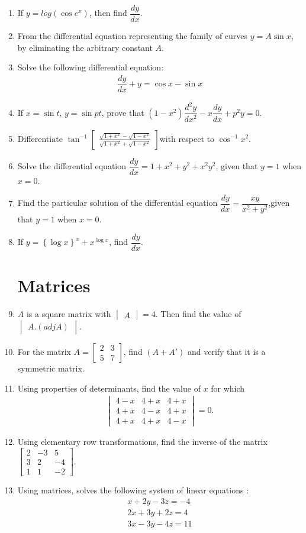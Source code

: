 \documentclass[12pt,-letter paper]{article}
\providecommand{\mydet}[1]{\ensuremath{\begin{vmatrix}#1\end{vmatrix}}}
\providecommand{\myvec}[1]{\ensuremath{\begin{bmatrix}#1\end{bmatrix}}}
\providecommand{\cbrak}[1]{\ensuremath{\left\{#1\right\}}}
\providecommand{\brak}[1]{\ensuremath{\left(#1\right)}}
\begin{document}
{\begin{enumerate}
\section{\centering Differentiation}
\item If ${y}=log{\brak{\cos e^x}}$, then find $\dfrac{dy}{dx}$.
\item From the differential equation representing the family of curves ${y} = A\sin x$, by eliminating the arbitrary constant ${A}$.
\item Solve the following differential equation: \begin{align*} \dfrac{dy}{dx}+{y}=\cos {x}-\sin {x} \end{align*}
\item If ${x}=\sin {t}$, ${y}=\sin {pt}$, prove that $(1-x^2)\dfrac{d^2 y}{d x^2}-x\dfrac{dy}{dx}+{p}^{2}{y}=0$.
\item Differentiate $\tan^{-1}\myvec{\frac{\sqrt{1+x^2}-\sqrt{1-x^2}}{\sqrt{1+x^2}+\sqrt{1-x^2}}} $with respect to $\cos^{-1} {x}^{2}$.
\item Solve the differential equation $\dfrac{dy}{dx} = 1+{x}^{2}+ {y}^{2}+{x}^{2}{y}^{2}$, given that ${y}=1$ when ${x}=0$.
\item Find the particular solution of the differential equation $\dfrac{dy}{dx}=\dfrac{xy}{x^{2}+y^{2}}$,given that ${y}=1$ when ${x}=0$.
\item If ${y}=\cbrak{\log{x}}^{x} + {x}^{\log{x}}$, find $\dfrac{dy}{dx}$.
\section{ \centering Matrices}
\item ${A}$ is a square matrix with $\mydet{A}=4$. Then find the value of $\mydet{ A.\brak {adj A}}$.
\item For the matrix ${A}=\myvec{2 & 3\\5 & 7}$, find $\brak{A+A'}$ and verify that it is a symmetric matrix.
\item Using properties of determinants, find the value of ${x}$ for which\begin{align*}\begin{vmatrix}4-x & 4+x & 4+x\\4+x & 4-x & 4+x\\4+x & 4+x & 4-x\end{vmatrix}=0.\end{align*}
\item Using elementary row transformations, find the inverse of the matrix $\myvec{2 & -3 & 5 \\3 & 2 & -4 \\1 & 1 & -2}$.
\item Using matrices, solves the following system of linear equations : \begin{align*}{x+2y-3z}=-4\\{2x+3y+2z}=4\\{3x-3y-4z}=11\\\end{align*}

\end{enumerate}}
\end{document}
